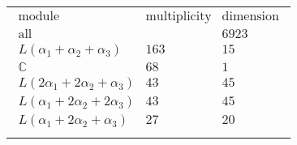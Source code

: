 \documentclass[crop,border=2mm]{standalone}
\begin{document}
\begin{tabular}{l}
$\displaystyle
\begin{array}{rll}
	\text{module}&\text{multiplicity}&\text{dimension} \\ \hline \text{all}&&6923 \\
	L\left(\alpha_{1}+\alpha_{2}+\alpha_{3}\right)&163&15\\
	\mathbb{C}&68&1\\
	L\left( 2\alpha_{1}+ 2\alpha_{2}+\alpha_{3}\right)&43&45\\
	L\left(\alpha_{1}+ 2\alpha_{2}+ 2\alpha_{3}\right)&43&45\\
	L\left(\alpha_{1}+ 2\alpha_{2}+\alpha_{3}\right)&27&20
\end{array}
$ \\ \\

\end{tabular}
\end{document}
